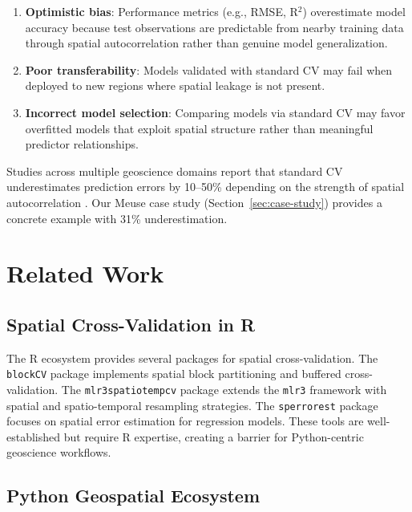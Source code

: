 \documentclass[review,12pt]{elsarticle}
\begin{document}
\begin{enumerate}
\item \textbf{Optimistic bias}: Performance metrics (e.g., RMSE, R$^2$) overestimate model accuracy because test observations are predictable from nearby training data through spatial autocorrelation rather than genuine model generalization.
\item \textbf{Poor transferability}: Models validated with standard CV may fail when deployed to new regions where spatial leakage is not present.
\item \textbf{Incorrect model selection}: Comparing models via standard CV may favor overfitted models that exploit spatial structure rather than meaningful predictor relationships.
\end{enumerate}

Studies across multiple geoscience domains report that standard CV underestimates prediction errors by 10--50\% depending on the strength of spatial autocorrelation \citep{meyer2018improving, ploton2020spatial, wadoux2021spatial}. Our Meuse case study (Section~\ref{sec:case-study}) provides a concrete example with 31\% underestimation.


\section{Related Work}\label{sec:related}

\subsection{Spatial Cross-Validation in R}

The R ecosystem provides several packages for spatial cross-validation. The \texttt{blockCV} package \citep{valavi2019blockcv} implements spatial block partitioning and buffered cross-validation. The \texttt{mlr3spatiotempcv} package \citep{schratz2019hyperparameter} extends the \texttt{mlr3} framework with spatial and spatio-temporal resampling strategies. The \texttt{sperrorest} package \citep{brenning2012spatial} focuses on spatial error estimation for regression models. These tools are well-established but require R expertise, creating a barrier for Python-centric geoscience workflows.

\subsection{Python Geospatial Ecosystem}
\end{document}

